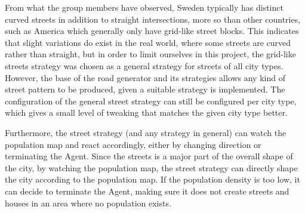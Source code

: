 From what the group members have observed, Sweden typically has distinct curved streets in addition to straight intersections, more so than other countries, such as America which generally only have grid-like street blocks.
This indicates that slight variations do exist in the real world, where some streets are curved rather than straight, but in order to limit ourselves in this project, the grid-like streets strategy was chosen as a general strategy for streets of all city types.
However, the base of the road generator and its strategies allows any kind of street pattern to be produced, given a suitable strategy is implemented.
The configuration of the general street strategy can still be configured per city type, which gives a small level of tweaking that matches the given city type better.

Furthermore, the street strategy (and any strategy in general) can watch the population map and react accordingly, either by changing direction or terminating the Agent.
Since the streets is a major part of the overall shape of the city, by watching the population map, the street strategy can directly shape the city according to the population map.
If the population density is too low, it can decide to terminate the Agent, making sure it does not create streets and houses in an area where no population exists.
